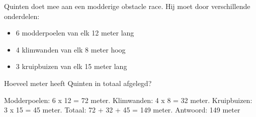 \begin{opgave}
Quinten doet mee aan een modderige obstacle race. Hij moet door verschillende onderdelen:

\begin{itemize}
\item 6 modderpoelen van elk 12 meter lang
\item 4 klimwanden van elk 8 meter hoog  
\item 3 kruipbuizen van elk 15 meter lang
\end{itemize}

Hoeveel meter heeft Quinten in totaal afgelegd?
\end{opgave}

\begin{oplossing}
Modderpoelen: 6 x 12 = 72 meter.
Klimwanden: 4 x 8 = 32 meter.
Kruipbuizen: 3 x 15 = 45 meter.
Totaal: 72 + 32 + 45 = 149 meter.
Antwoord: 149 meter
\end{oplossing}